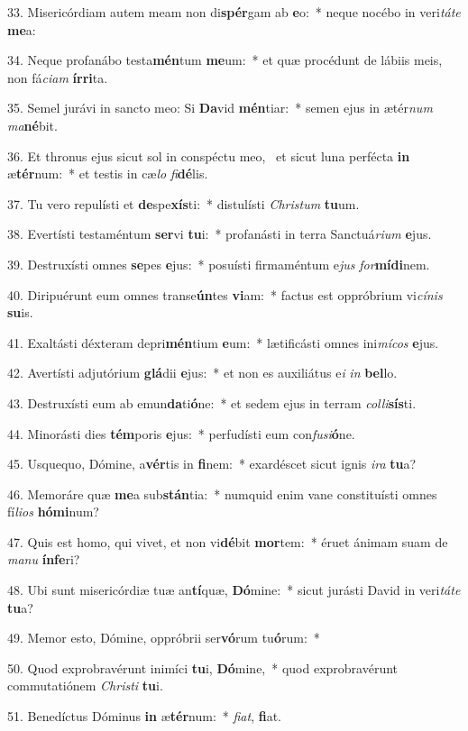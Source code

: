 33. Misericórdiam autem meam non di\textbf{spér}gam ab \textbf{e}o:~*  neque nocébo in veri\textit{tá}\textit{te} \textbf{me}a:\

34. Neque profanábo testa\textbf{mén}tum \textbf{me}um:~*  et quæ procédunt de lábiis meis, non fá\textit{ci}\textit{am} \textbf{ír}\textbf{ri}ta.\

35. Semel jurávi in sancto meo: Si \textbf{Da}vid \textbf{mén}tiar:~*  semen ejus in ætér\textit{num} \textit{ma}\textbf{né}bit.\

36. Et thronus ejus sicut sol in conspéctu meo, \dag\  et sicut luna perfécta \textbf{in} æ\textbf{tér}num:~*  et testis in cæ\textit{lo} \textit{fi}\textbf{dé}lis.\

37. Tu vero repulísti et \textbf{de}spe\textbf{xís}ti:~*  distulísti \textit{Chris}\textit{tum} \textbf{tu}um.\

38. Evertísti testaméntum \textbf{ser}vi \textbf{tu}i:~*  profanásti in terra Sanctuá\textit{ri}\textit{um} \textbf{e}jus.\

39. Destruxísti omnes \textbf{se}pes \textbf{e}jus:~*  posuísti firmaméntum e\textit{jus} \textit{for}\textbf{mí}\textbf{di}nem.\

40. Diripuérunt eum omnes transe\textbf{ún}tes \textbf{vi}am:~*  factus est oppróbrium vi\textit{cí}\textit{nis} \textbf{su}is.\

41. Exaltásti déxteram depri\textbf{mén}tium \textbf{e}um:~*  lætificásti omnes ini\textit{mí}\textit{cos} \textbf{e}jus.\

42. Avertísti adjutórium \textbf{glá}dii \textbf{e}jus:~*  et non es auxiliátus e\textit{i} \textit{in} \textbf{bel}lo.\

43. Destruxísti eum ab emun\textbf{da}ti\textbf{ó}ne:~*  et sedem ejus in terram \textit{col}\textit{li}\textbf{sís}ti.\

44. Minorásti dies \textbf{tém}poris \textbf{e}jus:~*  perfudísti eum con\textit{fu}\textit{si}\textbf{ó}ne.\

45. Usquequo, Dómine, a\textbf{vér}tis in \textbf{fi}nem:~*  exardéscet sicut ignis \textit{i}\textit{ra} \textbf{tu}a?\

46. Memoráre quæ \textbf{me}a sub\textbf{stán}tia:~*  numquid enim vane constituísti omnes fí\textit{li}\textit{os} \textbf{hó}\textbf{mi}num?\

47. Quis est homo, qui vivet, et non vi\textbf{dé}bit \textbf{mor}tem:~*  éruet ánimam suam de \textit{ma}\textit{nu} \textbf{ín}\textbf{fe}ri?\

48. Ubi sunt misericórdiæ tuæ an\textbf{tí}quæ, \textbf{Dó}mine:~*  sicut jurásti David in veri\textit{tá}\textit{te} \textbf{tu}a?\

49. Memor esto, Dómine, oppróbrii ser\textbf{vó}rum tu\textbf{ó}rum:~*  \

50. Quod exprobravérunt inimíci \textbf{tu}i, \textbf{Dó}mine,~*  quod exprobravérunt commutatiónem \textit{Chris}\textit{ti} \textbf{tu}i.\

51. Benedíctus Dóminus \textbf{in} æ\textbf{tér}num:~*  \textit{fi}\textit{at}, \textbf{fi}at.\

